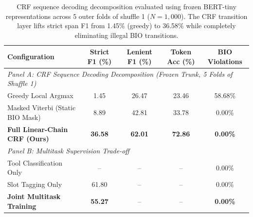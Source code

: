 \begin{table}[t]
\centering
\small
\caption{CRF sequence decoding decomposition evaluated using frozen BERT-tiny representations across 5 outer folds of shuffle 1 ($N=1{,}000$). The CRF transition layer lifts strict span F1 from 1.45\% (greedy) to 36.58\% while completely eliminating illegal BIO transitions.}
\label{tab:ablations}
\begin{tabular}{lcccc}
\toprule
\textbf{Configuration} & \textbf{Strict F1 (\%)} & \textbf{Lenient F1 (\%)} & \textbf{Token Acc (\%)} & \textbf{BIO Violations} \\
\midrule
\multicolumn{5}{l}{\textit{Panel A: CRF Sequence Decoding Decomposition (Frozen Trunk, 5 Folds of Shuffle 1)}} \\
\quad Greedy Local Argmax & 1.45 & 26.47 & 23.46 & 58.68\% \\
\quad Masked Viterbi (Static BIO Mask) & 8.89 & 42.81 & 33.78 & 0.00\% \\
\quad \textbf{Full Linear-Chain CRF (Ours)} & \textbf{36.58} & \textbf{62.01} & \textbf{72.86} & \textbf{0.00\%} \\
\midrule
\multicolumn{5}{l}{\textit{Panel B: Multitask Supervision Trade-off}} \\
\quad Tool Classification Only & -- & -- & -- & 0.00\% \\
\quad Slot Tagging Only & 61.80 & -- & -- & 0.00\% \\
\quad \textbf{Joint Multitask Training} & \textbf{55.27} & -- & -- & \textbf{0.00\%} \\
\bottomrule
\end{tabular}
\end{table}

